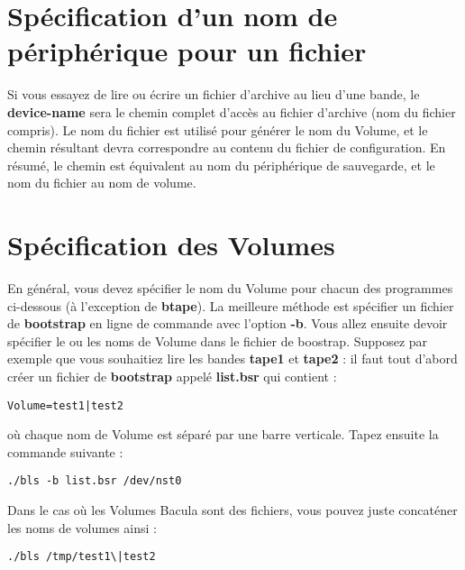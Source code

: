 \section{Spécification d'un nom de périphérique pour un fichier}

Si vous essayez de lire ou écrire un fichier d'archive au lieu d'une bande, le
{\bf device-name} sera le chemin complet d'accès au fichier d'archive (nom du
fichier compris). Le nom du fichier est utilisé pour générer le nom du Volume, 
et le chemin résultant devra correspondre au contenu du fichier de 
configuration. En résumé, le chemin est équivalent au nom du périphérique de
sauvegarde, et le nom du fichier au nom de volume.


\section{Spécification des Volumes}

En général, vous devez spécifier le nom du Volume pour chacun des programmes
ci-dessous (à l'exception de {\bf btape}). La meilleure méthode est spécifier
un fichier de {\bf bootstrap} en ligne de commande avec l'option {\bf -b}.
Vous allez ensuite devoir spécifier le ou les noms de Volume dans le fichier de 
boostrap. Supposez par exemple que vous souhaitiez lire les bandes {\bf tape1} 
et {\bf tape2} : il faut tout d'abord créer un fichier de {\bf bootstrap}
appelé {\bf list.bsr} qui contient : 

\footnotesize
\begin{verbatim}
Volume=test1|test2
\end{verbatim}
\normalsize

où chaque nom de Volume est séparé par une barre verticale. Tapez ensuite la
commande suivante :

\footnotesize
\begin{verbatim}
./bls -b list.bsr /dev/nst0
\end{verbatim}
\normalsize

Dans le cas où les Volumes Bacula sont des fichiers, vous pouvez juste
concaténer les noms de volumes ainsi :

\footnotesize
\begin{verbatim}
./bls /tmp/test1\|test2
\end{verbatim}
\normalsize

